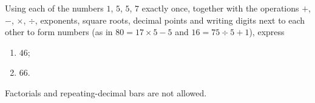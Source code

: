 Using each of the numbers $1$, $5$, $5$, $7$ exactly once, together with the operations $+$, $-$, $\times$, $\div$, exponents, square roots, decimal points and writing digits next to each other to form numbers (as in $80=17\times5-5$ and $16=75\div5+1$), express
\begin{enumerate}
\item[(a)] $46$;
\item[(b)] $66$.
\end{enumerate}
Factorials and repeating-decimal bars are not allowed.
